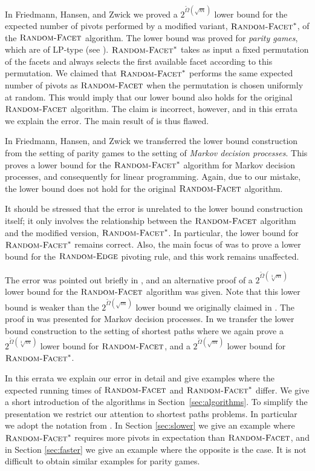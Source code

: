 \documentclass[twoside,11pt]{article}
\newcommand{\RandomFacet}{\mbox{\sc Random-}\allowbreak\mbox{\sc Facet}}
\newcommand{\RandomEdge}{\mbox{\sc Random-}\allowbreak\mbox{\sc Edge}}
\begin{document}
In Friedmann, Hansen, and Zwick \cite{FriedmannHansenZwick/SODA11} we proved a $2^{\tilde\Omega(\sqrt{m})}$ lower bound for the expected number of pivots performed by a modified variant, $\RandomFacet^*$, of the $\RandomFacet$ algorithm. The lower bound was proved for \emph{parity games}, which are of LP-type (see \cite{Halman07}). $\RandomFacet^*$ takes as input a fixed permutation of the facets and always selects the first available facet according to this permutation. We claimed that $\RandomFacet^*$ performs the same expected number of pivots as $\RandomFacet$ when the permutation is chosen uniformly at random. This would imply that our lower bound also holds for the original $\RandomFacet$ algorithm. The claim is incorrect, however, and in this errata we explain the error. The main result of \cite{FriedmannHansenZwick/SODA11} is thus flawed.

In Friedmann, Hansen, and Zwick \cite{FriedmannHansenZwick/STOC11} we transferred the lower bound construction from the setting of parity games to the setting of \emph{Markov decision processes}. This proves a lower bound for the $\RandomFacet^*$ algorithm for Markov decision processes, and consequently for linear programming. Again, due to our mistake, the lower bound does not hold for the original $\RandomFacet$ algorithm.

It should be stressed that the error is unrelated to the lower bound construction itself; it only involves the relationship between the $\RandomFacet$ algorithm and the modified version, $\RandomFacet^*$. In particular, the lower bound for $\RandomFacet^*$ remains correct. Also, the main focus of \cite{FriedmannHansenZwick/STOC11} was to prove a lower bound for the $\RandomEdge$ pivoting rule, and this work remains unaffected.

The error was pointed out briefly in \cite{Hansen12}, and an alternative proof of a $2^{\tilde\Omega(\sqrt[3]{m})}$ lower bound for the $\RandomFacet$ algorithm was given. Note that this lower bound is weaker than the $2^{\tilde\Omega(\sqrt{m})}$ lower bound we originally claimed in \cite{FriedmannHansenZwick/SODA11,FriedmannHansenZwick/STOC11}. The proof in \cite{Hansen12} was presented for Markov decision processes. In \cite{FriedmannHansenZwick/2014} we transfer the lower bound construction to the setting of shortest paths where we again prove a $2^{\tilde\Omega(\sqrt[3]{m})}$ lower bound for $\RandomFacet$, and a $2^{\tilde\Omega(\sqrt{m})}$ lower bound for $\RandomFacet^*$.

In this errata we explain our error in detail and give examples where the expected running times of $\RandomFacet$ and $\RandomFacet^*$ differ. We give a short introduction of the algorithms in Section~\ref{sec:algorithms}. To simplify the presentation we restrict our attention to shortest paths problems. In particular we adopt the notation from \cite{FriedmannHansenZwick/2014}. In Section \ref{sec:slower} we give an example where $\RandomFacet^*$ requires more pivots in expectation than $\RandomFacet$, and in Section \ref{sec:faster} we give an example where the opposite is the case. It is not difficult to obtain similar examples for parity games.
\end{document}
